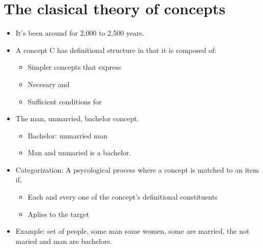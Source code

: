 \section{The clasical theory of concepts}
\begin{itemize}
    \item It's been around for 2,000 to 2,500 years.
    \item A concept C has definitional structure in that it is composed of:
        \begin{itemize}
            \item Simpler concepts that express 
            \item Necesary and 
            \item Sufficient conditions for 
        \end{itemize}
    
    \item The man, unmarried, bachelor concept.
        \begin{itemize}
            \item Bachelor: unmarried man 
            \item Man and unmaried is a bachelor.
        \end{itemize}
    
    \item Categorization: A psycological process where a concept is matched to an item if,
        \begin{itemize}
            \item Each and every one of the concept's definitional constituents 
            \item Aplies to the target 
        \end{itemize}
    
    \item Example: set of people, some man some women, some are married, the not maried and man are bachelors.
\end{itemize}

